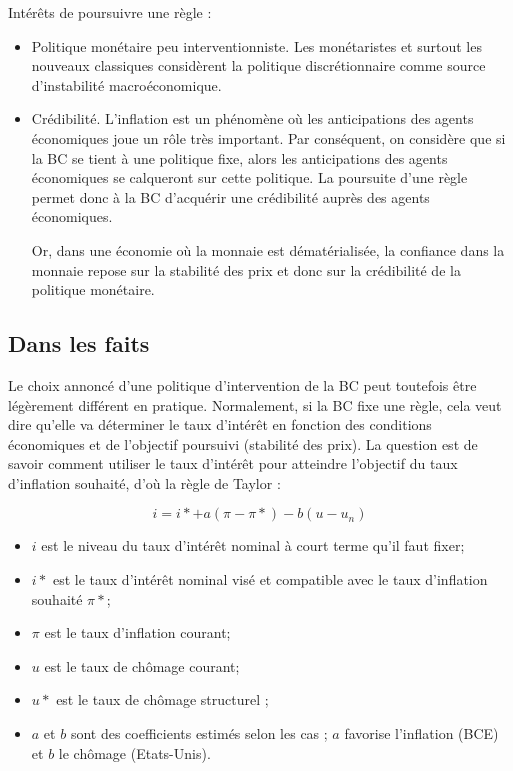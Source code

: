 Intérêts de poursuivre une règle : 

\begin{itemize}
	\item Politique monétaire peu interventionniste. Les monétaristes et surtout les nouveaux classiques considèrent la politique discrétionnaire comme source d'instabilité macroéconomique.
	\item Crédibilité. L'inflation est un phénomène où les anticipations des agents économiques joue un rôle très important. Par conséquent, on considère que si la BC se tient à une politique fixe, alors les anticipations des agents économiques se calqueront sur cette politique. La poursuite d'une règle permet donc à la BC d'acquérir une crédibilité auprès des agents économiques.

	Or, dans une économie où la monnaie est dématérialisée, la confiance dans la monnaie repose sur la stabilité des prix et donc sur la crédibilité de la politique monétaire.
\end{itemize}

	\subsection{Dans les faits}
	
	Le choix annoncé d'une politique d'intervention de la BC peut toutefois être légèrement différent en pratique. Normalement, si la BC fixe une règle, cela veut dire qu'elle va déterminer le taux d'intérêt en fonction des conditions économiques et de l'objectif poursuivi (stabilité des prix). La question est de savoir comment utiliser le taux d'intérêt pour atteindre 
l'objectif du taux d'inflation souhaité, d'où la règle de Taylor :

	$$i = i* + a(\pi - \pi*) - b(u - u_n)$$

	\begin{itemize}
		\item $i$ est le niveau du taux d'intérêt nominal à court terme qu'il faut fixer;
		\item $i*$ est le taux d'intérêt nominal visé et compatible avec le taux d'inflation souhaité $\pi*$;
		\item $\pi$ est le taux d'inflation courant;
		\item $u$ est le taux de chômage courant;
		\item $u*$ est le taux de chômage structurel ;
		\item $a$ et $b$ sont des coefficients estimés selon les cas ; $a$ favorise l'inflation (BCE) et $b$ le chômage (Etats-Unis).
	\end{itemize}
